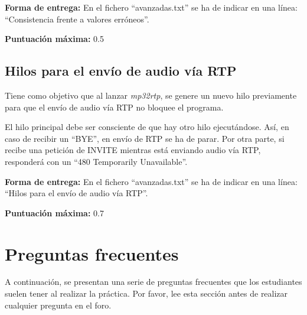 \documentclass[a4paper,11pt]{article}
\begin{document}
  {\bf Forma de entrega:} En el fichero ``avanzadas.txt'' se ha de indicar en una línea: ``Consistencia frente a valores erróneos''.

  {\bf Puntuación máxima:} 0.5



\subsection*{Hilos para el envío de audio vía RTP}

Tiene como objetivo que al lanzar \emph{mp32rtp}, se genere un nuevo hilo previamente para que el envío de audio vía RTP no bloquee el programa.

El hilo principal debe ser consciente de que hay otro hilo ejecutándose. Así, en caso de recibir un ``BYE'', en envío de RTP se ha de parar. Por otra parte, si recibe una petición de INVITE mientras está enviando audio vía RTP, responderá con un ``480 Temporarily Unavailable''.

  {\bf Forma de entrega:} En el fichero ``avanzadas.txt'' se ha de indicar en una línea: ``Hilos para el envío de audio vía RTP''.

  {\bf Puntuación máxima:} 0.7


\newpage
\section{Preguntas frecuentes}

A continuación, se presentan una serie de preguntas frecuentes que los estudiantes
suelen tener al realizar la práctica. Por favor, lee esta sección antes de realizar
cualquier pregunta en el foro.
\end{document}
